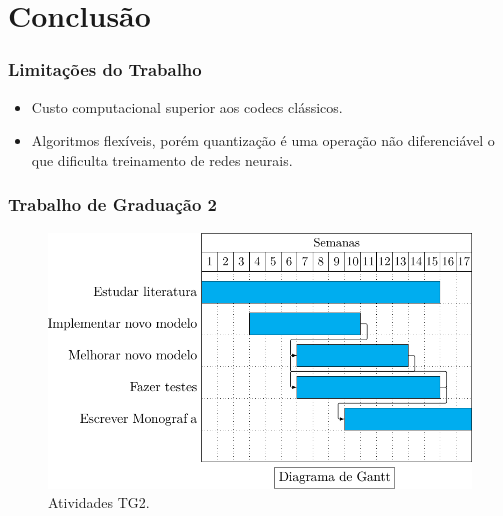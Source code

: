 \documentclass{beamer}
\begin{document}
\section{Conclusão}
\begin{frame}
\frametitle{Limitações do Trabalho}
\begin{itemize}
\item Custo computacional superior aos codecs clássicos.
\item Algoritmos flexíveis, porém quantização é uma operação não diferenciável o que dificulta treinamento de redes neurais.
\end{itemize}
\end{frame}
\begin{frame}
\frametitle{Trabalho de Graduação 2}
\begin{figure}
\includegraphics[width=\textwidth]{figs/diagram.pdf}
\caption{Atividades TG2.}
\end{figure}
\end{frame}
\end{document}
